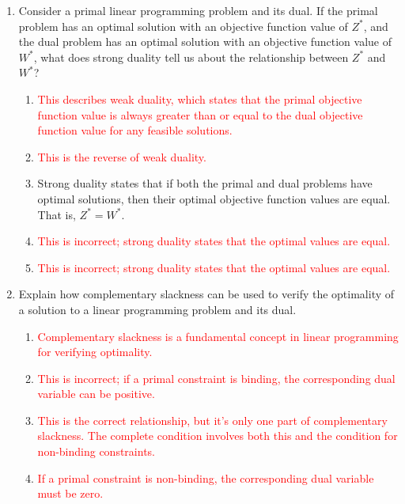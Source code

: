 \documentclass{article}%
\newcommand{\incorrect}[1]{\textcolor{red}{#1}}
\begin{document}
\begin{enumerate}
\begin{enumerate}
\item \incorrect{Dual variables are always non-negative.}%
\item \incorrect{The value of $y_i$ is restricted by complementary slackness; it cannot be any value.}%
\end{enumerate}%
\vspace{1em}%
\item Consider a primal linear programming problem and its dual.  If the primal problem has an optimal solution with an objective function value of $Z^*$, and the dual problem has an optimal solution with an objective function value of $W^*$, what does strong duality tell us about the relationship between $Z^*$ and $W^*$?%
\begin{enumerate}%
\item \incorrect{This describes weak duality, which states that the primal objective function value is always greater than or equal to the dual objective function value for any feasible solutions.}%
\item \incorrect{This is the reverse of weak duality.}%
\item Strong duality states that if both the primal and dual problems have optimal solutions, then their optimal objective function values are equal.  That is, $Z^* = W^*$.%
\item \incorrect{This is incorrect; strong duality states that the optimal values are equal.}%
\item \incorrect{This is incorrect; strong duality states that the optimal values are equal.}%
\end{enumerate}%
\vspace{1em}%
\item Explain how complementary slackness can be used to verify the optimality of a solution to a linear programming problem and its dual.%
\begin{enumerate}%
\item \incorrect{Complementary slackness is a fundamental concept in linear programming for verifying optimality.}%
\item \incorrect{This is incorrect; if a primal constraint is binding, the corresponding dual variable can be positive.}%
\item \incorrect{This is the correct relationship, but it's only one part of complementary slackness. The complete condition involves both this and the condition for non-binding constraints.}%
\item \incorrect{If a primal constraint is non-binding, the corresponding dual variable must be zero.}%

\end{enumerate}
\end{enumerate}
\end{document}
